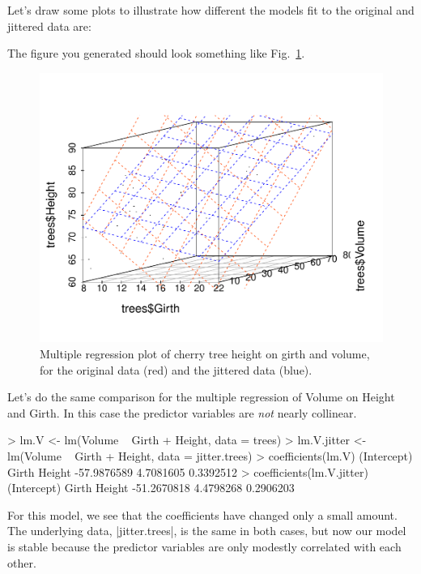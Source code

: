 Let's  draw some plots to illustrate how different the models fit to the original and jittered data are:
%
%
The figure you generated should look something like Fig.~\ref{fig:jittercompare}.
%
\begin{figure}[htbp]
\centering
\includegraphics[width=0.5\columnwidth]{./figures/hands-on4/trees-jitterfit-height.pdf}
\caption{Multiple regression plot of cherry tree height on girth and volume, for the original data (red) and the jittered data (blue).\label{fig:jittercompare}}
\end{figure}



Let's do the same comparison for the multiple regression of Volume on Height and Girth.  In this case the predictor variables are \emph{not} nearly collinear.
%
\begin{R}
> lm.V <- lm(Volume ~ Girth + Height, data = trees)
> lm.V.jitter <- lm(Volume ~ Girth + Height, data = jitter.trees)
> coefficients(lm.V)
(Intercept)       Girth      Height 
-57.9876589   4.7081605   0.3392512 
> coefficients(lm.V.jitter)
(Intercept)       Girth      Height 
-51.2670818   4.4798268   0.2906203 
\end{R}
%
For this model, we see that the coefficients have changed only a small amount.  The underlying data, |jitter.trees|, is the same in both cases, but now our model is stable because the predictor variables are only modestly correlated with each other.

